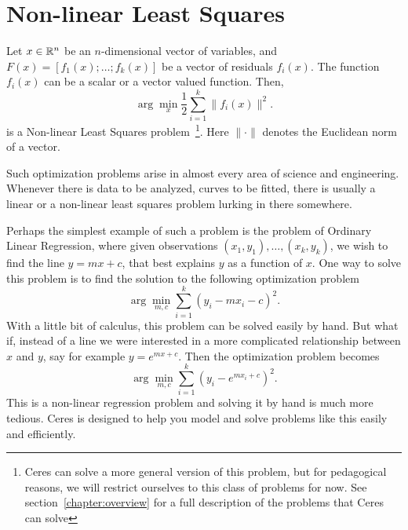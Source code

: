 \chapter{Non-linear Least Squares}
\label{chapter:tutorial:nonlinsq}
Let $x \in \mathbb{R}^n$ be an $n$-dimensional vector of variables, and
$F(x) = \left[f_1(x); \hdots ; f_k(x)\right]$ be a vector of residuals $f_i(x)$. 
The function $f_i(x)$ can be a scalar or a vector valued
function.  Then, 
\begin{equation}
	\arg \min_x \frac{1}{2} \sum_{i=1}^k \|f_i(x)\|^2.
\end{equation}
is a Non-linear Least Squares problem~\footnote{Ceres can solve a more general version of this problem, but for pedagogical reasons, we will restrict ourselves to this class of problems for now. See section~\ref{chapter:overview} for a full description of the problems that Ceres can solve}. Here $\|\cdot\|$ denotes the Euclidean norm of a vector. 

Such optimization problems arise in almost every area of science and engineering. Whenever there is data to be analyzed, curves to be fitted, there is usually a linear or a non-linear least squares problem lurking in there somewhere. 

Perhaps the simplest example of such a problem is the problem of Ordinary Linear Regression, where given observations $(x_1,y_1),\hdots, (x_k,y_k)$, we wish to find the line $y = mx + c$, that best explains $y$ as a function of $x$. One way to solve this problem is to find the solution to the following optimization problem
\begin{equation}
		\arg\min_{m,c} \sum_{i=1}^k (y_i - m x_i - c)^2.
\end{equation}
With a little bit of calculus, this problem can be solved easily by hand. But what if, instead of a line we were interested in a more complicated relationship between $x$ and $y$, say for example $y = e^{mx + c}$. Then the optimization problem becomes
\begin{equation}
		\arg\min_{m,c} \sum_{i=1}^k \left(y_i - e^{m x_i + c}\right)^2.
\end{equation}
This is a  non-linear regression problem and solving it by hand is much more tedious.  Ceres is designed to help you model and solve problems like this easily and efficiently.